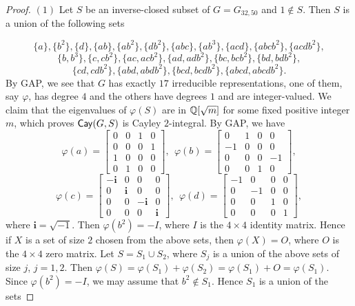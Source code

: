 \documentclass[10pt,a4paper]{amsart}
\def\Cay{{\sf Cay}} \def\Ker{{\sf Ker}}
\begin{document}
\begin{proof}
	$(1)$ Let $S$ be an inverse-closed subset of $G=G_{32,50}$ and $1\notin S$. Then
	$S$ is a union of the following sets
	
	
	$$\{ a \}, \{ b^2 \}, \{ d \}, \{ ab \}, \{ ab^2 \},\{ db^2 \},	\{ abc \},\{ ab^3 \},\{ acd \}, \{ abcb^2 \}, \{ acdb^2 \},$$
	$$ 
	\{ b, b^3\}, \{ c, cb^2 \},\{ ac, acb^2 \},
	\{ ad, adb^2 \}, \{ bc, bcb^2 \}, \{ bd, bdb^2 \},$$
	$$\{ cd, cdb^2 \}, \{ abd, abdb^2 \},   \{ bcd, bcdb^2 \},
	\{ abcd, abcdb^2 \}. $$
	By GAP, we see that $G$ has exactly $17$ irreducible representations, one of them, say $\varphi$, has degree $4$ and the others have degrees $1$ and are integer-valued. We claim that the eigenvalues of $\varphi(S)$ are in $\Bbb Q[\sqrt{m}]$ for some fixed positive integer $m$, which  proves $\Cay(G,S)$ is Cayley $2$-integral.  By GAP, we have
	\begin{equation*}
		\varphi(a)=\begin{bmatrix}
			0& 0&1&0 \\
			0&0&0&1\\
			1&0&0&0\\
			0&1&0&0
		\end{bmatrix},~~	\varphi(b)=\begin{bmatrix}
			0& 1&0&0 \\
			-1&0&0&0\\
			0&0&0&-1\\
			0&0&1&0
		\end{bmatrix},
	\end{equation*}
	\begin{equation*}
		\varphi(c)=\begin{bmatrix}
			-\textbf{i}& 0&0&0 \\
			0&\textbf{i}&0&0\\
			0&0&-\textbf{i}&0\\
			0&0&0&\textbf{i}
		\end{bmatrix},~~	\varphi(d)=\begin{bmatrix}
			-1& 0&0&0 \\
			0&-1&0&0\\
			0&0&1&0\\
			0&0&0&1
		\end{bmatrix},
	\end{equation*}
	where $\textbf{i}=\sqrt{-1}$. Then $\varphi(b^2)=-I$, where $I$ is the $4\times 4$ identity matrix. Hence if $X$ is a set of size $2$ chosen from the above sets, then $\varphi(X)=O$, where $O$ is the $4\times 4$ zero matrix. Let $S=S_1\cup S_2$, where $S_j$ is a union of the above sets of size $j$, $j=1,2$. Then $\varphi(S)=\varphi(S_1)+\varphi(S_2)=\varphi(S_1)+O=\varphi(S_1)$. Since $\varphi(b^2)=-I$, we may assume that $b^2\notin S_1$. Hence $S_1$ is a union of the sets 

\end{proof}
\end{document}

